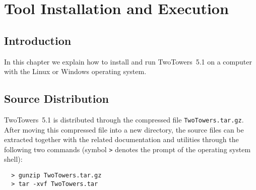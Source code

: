 \chapter{Tool Installation and Execution}


\section{Introduction}

In this chapter we explain how to install and run TwoTowers~5.1 on a computer with the Linux or Windows
operating system.



\section{Source Distribution}

TwoTowers~5.1 is distributed through the compressed file {\tt TwoTowers.tar.gz}. After moving this
compressed file into a new directory, the source files can be extracted together with the related
documentation and utilities through the following two commands (symbol {\tt >} denotes the prompt of the
operating system shell):

	\begin{verbatim}
  > gunzip TwoTowers.tar.gz
  > tar -xvf TwoTowers.tar
	\end{verbatim}


